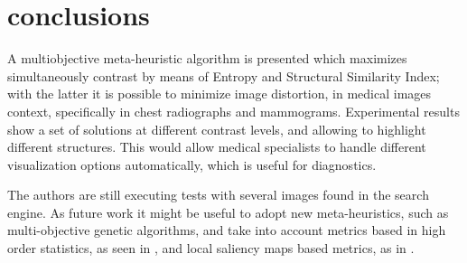 \documentclass[spanish,twocolumn]{article}
\begin{document}
{\section{conclusions}
\label{sec:conclusion}
A multiobjective meta-heuristic algorithm is presented which maximizes simultaneously contrast by means of Entropy and Structural Similarity Index; with the latter it is possible to minimize image distortion, in medical images context, specifically in chest radiographs and mammograms. Experimental results show a set of solutions at different contrast levels, and allowing to highlight different structures. This would allow medical specialists to handle different visualization options automatically, which is useful for diagnostics.

The authors are still executing tests with several images found in the search engine. As future work it might be useful to adopt new meta-heuristics, such as multi-objective genetic algorithms, and take into account metrics based in high order statistics, as seen in \cite{7056527}, and local saliency maps based metrics, as in \cite{LTG}.




\onecolumn
\noindent\begin{minipage}[b]{1.0\linewidth}
  \centering
   

\end{minipage}}
\end{document}
